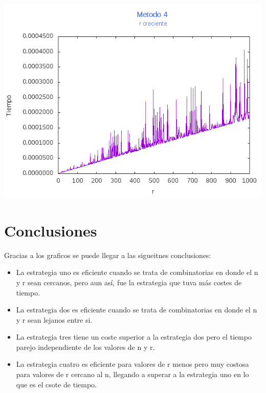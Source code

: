 \documentclass[12pt,letterpaper]{scrartcl}
\begin{document}
\includegraphics[scale=1]{Metodo4/plot1m4}

\section{Conclusiones}

Gracias a los graficos se puede llegar a las sigueitnes conclusiones:

\begin{itemize}
\item La estrategia uno es eficiente cuando se trata de combinatorias en donde el n y r sean cercanos, pero aun así, fue la estrategia que tuva más costes de tiempo.
\item La estrategia dos es eficiente cuando se trata de combinatorias en donde el n y r sean lejanos entre si.
\item La estrategia tres tiene un coste superior a la estrategia dos pero el tiempo parejo independiente de los valores de n y r.
\item La estrategia cuatro es eficiente para valores de r menos pero muy costosa para valores de r cercano al n, llegando a superar a la estrategia uno en lo que es el csote de tiempo.
\end{itemize}
\end{document}
